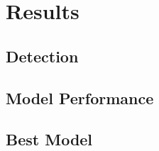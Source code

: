 

\section{Results}
\label{results}

\subsection{Detection}

\subsection{Model Performance}

\subsection{Best Model}